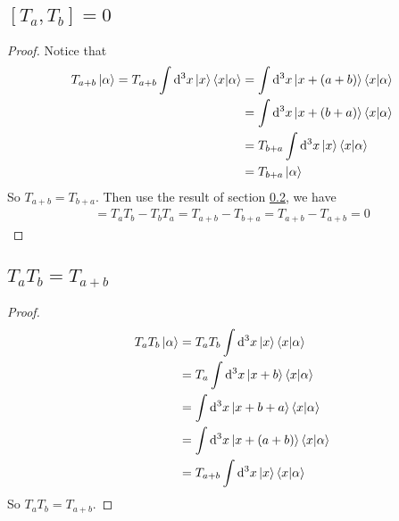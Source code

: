 \documentclass{article}
\begin{document}
\subsection{\texorpdfstring{$[T_a,T_b]=0$}{}}
\begin{proof}
Notice that
\begin{align*}
    T_{a+b} \ket{\alpha} = T_{a+b} \int \dd[3]{x} \ket{x} \braket{x|\alpha}
    &=  \int \dd[3]{x} \ket{x+(a+b)} \braket{x|\alpha} \\
    &=  \int \dd[3]{x} \ket{x+(b+a)} \braket{x|\alpha} \\
    &=  T_{b+a} \int \dd[3]{x} \ket{x} \braket{x|\alpha} \\
    &=  T_{b+a} \ket{\alpha}
\end{align*}
So $T_{a+b} = T_{b+a}$. Then use the result of section \ref{sec:3.3},
we have
\begin{align*}
    [T_a,T_b] = T_a T_b - T_b T_a = T_{a+b} - T_{b+a} = T_{a+b} -
    T_{a+b} = 0
\end{align*}
\end{proof}

\subsection{\texorpdfstring{$T_a T_b = T_{a+b}$}{}}
\label{sec:3.3}
\begin{proof}
\begin{align*}
    T_a T_b \ket{\alpha} &= T_a T_b \int \dd[3]{x} \ket{x}
        \braket{x|\alpha} \\
        &=  T_a \int \dd[3]{x} \ket{x+b} \braket{x|\alpha} \\
        &=  \int \dd[3]{x} \ket{x+b+a} \braket{x|\alpha} \\
        &=  \int \dd[3]{x} \ket{x+(a+b)} \braket{x|\alpha} \\
        &=  T_{a+b} \int \dd[3]{x} \ket{x} \braket{x|\alpha}
\end{align*}
So $T_a T_b = T_{a+b}$.
\end{proof}
\end{document}
